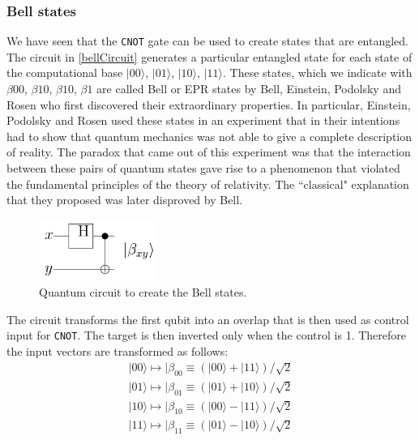 \documentclass[a4paper,10pt]{article}
\begin{document}
\subsubsection{Bell states}
We have seen that the \texttt{CNOT} gate can be used to create states that are entangled. The circuit in \autoref{bellCircuit} generates a particular entangled state for each state of the computational base $|00\rangle$, $|01\rangle$, $|10\rangle$, $|11\rangle$. These states, which we indicate with $\beta00$, $\beta10$, $\beta10$, $\beta1$ are called Bell or EPR states by Bell, Einstein, Podolsky and Rosen who first discovered their extraordinary properties. In particular, Einstein, Podolsky and Rosen used these states in an experiment that in their intentions had to show that quantum mechanics was not able to give a complete description of reality. The paradox that came out of this experiment was that the interaction between these pairs of quantum states gave rise to a phenomenon that violated the fundamental principles of the theory of relativity. The ``classical" explanation that they proposed was later disproved by Bell.
\begin{figure}[!htb]
\begin{center}
\includegraphics[width=1.5in]{images/bellCircuit.png}
\caption{Quantum circuit to create the Bell states.}
\label{bellCircuit}
\end{center}
\end{figure}

The circuit transforms the first qubit into an overlap that is then used as control input for \texttt{CNOT}. The target is then inverted only when the control is 1. Therefore the input vectors are transformed as follows:
\begin{equation}
\begin{split}
|00\rangle \mapsto |\beta_{00} \equiv (|00\rangle + |11\rangle) / \sqrt{2} \\
|01\rangle \mapsto |\beta_{01} \equiv (|01\rangle + |10\rangle) / \sqrt{2} \\
|10\rangle \mapsto |\beta_{10} \equiv (|00\rangle - |11\rangle) / \sqrt{2} \\
|11\rangle \mapsto |\beta_{11} \equiv (|01\rangle - |10\rangle) / \sqrt{2}
\end{split}
\label{eq:bellStates}
\end{equation}
\end{document}
